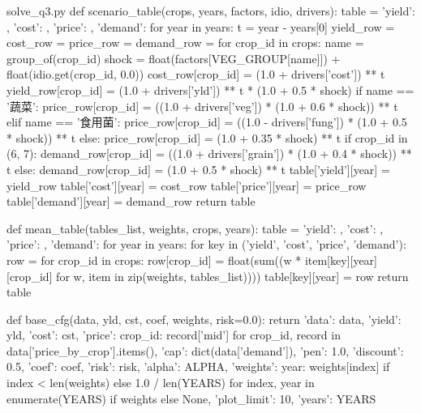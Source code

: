 \documentclass[bwprint]{gmcmthesis}
\begin{document}
\begin{appendices}
\begin{Python}{solve\_q3.py}
def scenario_table(crops, years, factors, idio, drivers):
    table = {'yield': {}, 'cost': {}, 'price': {}, 'demand': {}}
    for year in years:
        t = year - years[0]
        yield_row = {}
        cost_row = {}
        price_row = {}
        demand_row = {}
        for crop_id in crops:
            name = group_of(crop_id)
            shock = float(factors[VEG_GROUP[name]]) + float(idio.get(crop_id, 0.0))
            cost_row[crop_id] = (1.0 + drivers['cost']) ** t
            yield_row[crop_id] = (1.0 + drivers['yld']) ** t * (1.0 + 0.5 * shock)
            if name == '蔬菜':
                price_row[crop_id] = ((1.0 + drivers['veg']) * (1.0 + 0.6 * shock)) ** t
            elif name == '食用菌':
                price_row[crop_id] = ((1.0 - drivers['fung']) * (1.0 + 0.5 * shock)) ** t
            else:
                price_row[crop_id] = (1.0 + 0.35 * shock) ** t
            if crop_id in (6, 7):
                demand_row[crop_id] = ((1.0 + drivers['grain']) * (1.0 + 0.4 * shock)) ** t
            else:
                demand_row[crop_id] = (1.0 + 0.5 * shock) ** t
        table['yield'][year] = yield_row
        table['cost'][year] = cost_row
        table['price'][year] = price_row
        table['demand'][year] = demand_row
    return table

def mean_table(tables_list, weights, crops, years):
    table = {'yield': {}, 'cost': {}, 'price': {}, 'demand': {}}
    for year in years:
        for key in ('yield', 'cost', 'price', 'demand'):
            row = {}
            for crop_id in crops:
                row[crop_id] = float(sum((w * item[key][year][crop_id] for w, item in zip(weights, tables_list))))
            table[key][year] = row
    return table

def base_cfg(data, yld, cst, coef, weights, risk=0.0):
    return {'data': data, 'yield': yld, 'cost': cst, 'price': {crop_id: record['mid'] for crop_id, record in data['price_by_crop'].items()}, 'cap': dict(data['demand']), 'pen': 1.0, 'discount': 0.5, 'coef': coef, 'risk': risk, 'alpha': ALPHA, 'weights': {year: weights[index] if index < len(weights) else 1.0 / len(YEARS) for index, year in enumerate(YEARS)} if weights else None, 'plot_limit': 10, 'years': YEARS}


\end{Python}
\end{appendices}
\end{document}
